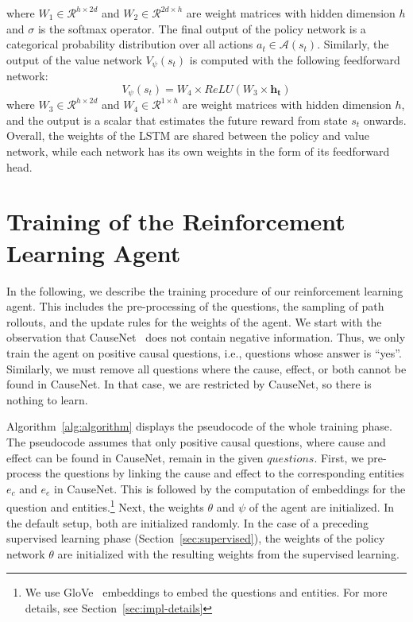 where $W_1 \in \mathcal{R}^{h \times 2d}$ and $W_2 \in \mathcal{R}^{2d \times h}$ are weight matrices with hidden dimension $h$ and $\sigma$ is the softmax operator.
The final output of the policy network is a categorical probability distribution over 
all actions $a_t \in \mathcal{A}(s_t)$.
Similarly, the output of the value network $V_{\psi}(s_t)$ is computed with the 
following feedforward network:
\begin{equation}
	V_{\psi}(s_t) = W_4 \times ReLU(W_3 \times \mathbf{h_t})
\end{equation}
where $W_3\in \mathcal{R}^{h \times 2d}$ and $W_4\in \mathcal{R}^{1 \times h}$ are weight matrices with hidden dimension $h$, and the output is a scalar that
estimates the future reward from state $s_t$ onwards. Overall, the weights of
the LSTM are shared between the policy and value network, while each network 
has its own weights in the form of its feedforward head.


\section{Training of the Reinforcement Learning Agent}
\label{sec:approach-description}

In the following, we describe the training procedure of our reinforcement learning agent.
This includes the pre-processing of the questions, the sampling of path rollouts, and the update rules 
for the weights of the agent.
We start with the observation that CauseNet~\cite{Heindorf2020Causenet} does not contain 
negative information. Thus, we only train the agent on positive causal questions, i.e., questions 
whose answer is ``yes''. 
Similarly, we must remove all questions where the cause, effect, or both cannot be found in CauseNet. 
In that case, we are restricted by CauseNet, so there is nothing to learn.


Algorithm~\ref{alg:algorithm} displays the pseudocode of the whole training phase.
The pseudocode assumes that only positive causal questions, where cause and effect can be found in 
CauseNet, remain in the given $questions$.
First, we pre-process the questions by linking the cause and effect to the corresponding 
entities $e_c$ and $e_e$ in CauseNet. This is followed by the computation of embeddings for the question and entities.\footnote{We use GloVe~\cite{Pennington2014Glove} embeddings to embed the questions and entities. For more details, see Section~\ref{sec:impl-details}}
Next, the weights $\theta$ and $\psi$ of the agent are initialized. 
In the default setup, both are initialized randomly.
In the case of a preceding supervised learning phase (Section~\ref{sec:supervised}), the weights 
of the policy network $\theta$ are initialized with the resulting weights from the supervised learning.

